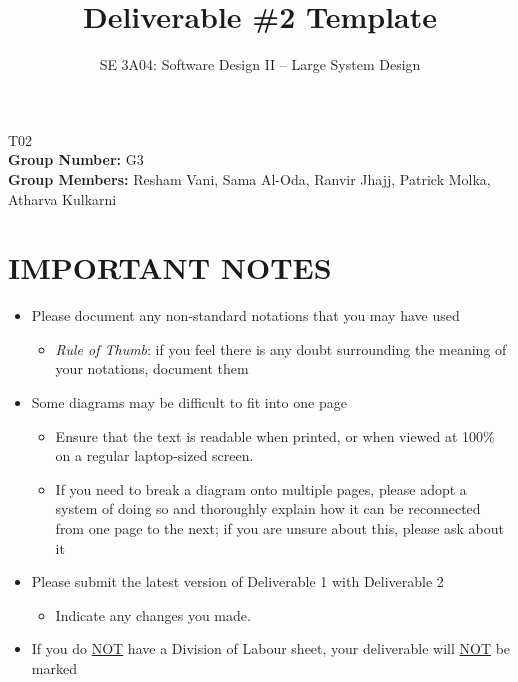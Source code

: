 \documentclass[]{article}
\title{Deliverable \#2 Template}
\author{SE 3A04: Software Design II -- Large System Design}
\date{}
\begin{document}





\maketitle	
{} T02\\
{\bf Group Number:} G3 \\
{\bf Group Members:} Resham Vani, Sama Al-Oda, Ranvir Jhajj, Patrick Molka, Atharva Kulkarni

\section*{IMPORTANT NOTES}
\begin{itemize}
	\item Please document any non-standard notations that you may have used
	\begin{itemize}
		\item \emph{Rule of Thumb}: if you feel there is any doubt surrounding the meaning of your notations, document them
	\end{itemize}
	\item Some diagrams may be difficult to fit into one page
	\begin{itemize}
		\item Ensure that the text is readable when printed, or when viewed at 100\% on a regular laptop-sized screen.
		\item If you need to break a diagram onto multiple pages, please adopt a system of doing so and thoroughly explain how it can be reconnected from one page to the next; if you are unsure about this, please ask about it
	\end{itemize}
	\item Please submit the latest version of Deliverable 1 with Deliverable 2
	\begin{itemize}
		\item Indicate any changes you made.
	\end{itemize}
	\item If you do \underline{NOT} have a Division of Labour sheet, your deliverable will \underline{NOT} be marked
\end{itemize}

\introduction
\end{document}
